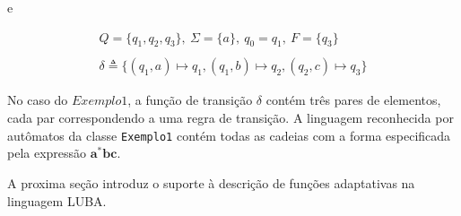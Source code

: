 \noindent e

	\begin{align*}
	Q = \{q_1, q_2, q_3\},\ \Sigma = \{a\},\ q_0 = q_1,\ F = \{ q_3\} \\
	\\
	\delta \triangleq \{ (q_1, a) \mapsto q_1, (q_1, b) \mapsto q_2, (q_2, c) \mapsto q_3 \} \tag{i}\label{d1-transicao}
	\end{align*}

\noindent
No caso do $\mathit{Exemplo1}$, a função de transição $\delta$ contém três pares de elementos, cada par correspondendo a uma regra de transição. A linguagem reconhecida por autômatos da classe \lstinline!Exemplo1! contém todas as cadeias com a forma especificada pela expressão $\mathbf{a^*bc}$.

A proxima seção introduz o suporte à descrição de funções adaptativas na linguagem LUBA.


